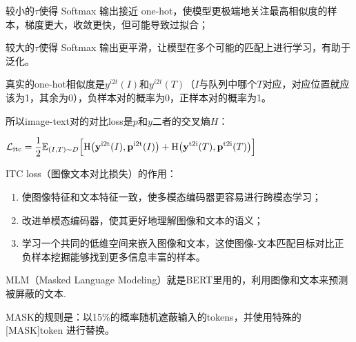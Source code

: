 \documentclass[zihao=false,fontset=windows]{ctexart}
\newcommand{\incode}[1]{\colorbox{inlinebg}{\ttfamily\small #1}}
\newcommand{\bigmath}[1]{%
  \begin{center}\large$\displaystyle #1$\end{center}%
}
\begin{document}
\begin{feishuquote}
较小的$\tau$使得 Softmax 输出接近 one-hot，使模型更极端地关注最高相似度的样本，梯度更大，收敛更快，但可能导致过拟合；\par
较大的$\tau$使得 Softmax 输出更平滑，让模型在多个可能的匹配上进行学习，有助于泛化。\par
\end{feishuquote}
真实的one-hot相似度是$y^{i2t}(I)$和$y^{i2t}(T)$（$I$与队列中哪个$T$对应，对应位置就应该为1，其余为0），负样本对的概率为0，正样本对的概率为1。\par
所以image-text对的对比loss是$p$和$y$二者的交叉熵$H$：\par
\bigmath{
\mathcal{L}_{\mathrm{itc}}=\frac{1}{2}\mathbb{E}_{(I,T)\sim D}\Bigl[\mathrm{H}\bigl(\mathbf{y}^{\mathrm{i2t}}(I),\mathbf{p}^{\mathrm{i2t}}(I)\bigr)+\mathrm{H}\bigl(\mathbf{y}^{\mathrm{t2i}}(T),\mathbf{p}^{\mathrm{t2i}}(T)\bigr)\Bigr]
}
ITC loss（图像文本对比损失）的作用：\par
\begin{enumerate}
\item 使图像特征和文本特征一致，使多模态编码器更容易进行跨模态学习；
\item 改进单模态编码器，使其更好地理解图像和文本的语义；
\item 学习一个共同的低维空间来嵌入图像和文本，这使图像-文本匹配目标对比正负样本挖掘能够找到更多信息丰富的样本。
\end{enumerate}
\par\vspace{0.75em}\par\vspace{0.28em}
MLM（Masked Language Modeling）就是BERT里用的，利用图像和文本来预测被屏蔽的文本.\par
MASK的规则是：以15\%的概率随机遮蔽输入的tokens，并使用特殊的\incode{[MASK]}token 进行替换。\par
\end{document}
